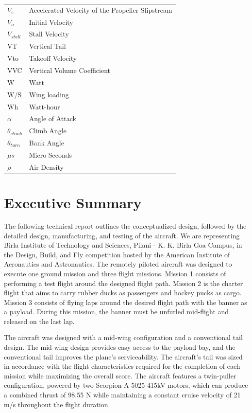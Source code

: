 \documentclass[10pt, letterpaper]{article}
\begin{document}
{\begin{minipage}{0.48\textwidth}
\begin{tabular}{ll}
$V_e$ & Accelerated Velocity of the Propeller Slipstream \\
$V_o$ & Initial Velocity \\
$V_{stall}$ & Stall Velocity \\
VT & Vertical Tail \\
Vto & Takeoff Velocity \\
VVC & Vertical Volume Coefficient \\
W & Watt \\
W/S & Wing loading \\
Wh & Watt-hour \\
$\alpha$ & Angle of Attack \\
$\theta_{climb}$ & Climb Angle \\
$\theta_{turn}$ & Bank Angle \\
$\mu s$ & Micro Seconds \\
$\rho$ & Air Density \\
\end{tabular}
\end{minipage}

}

\newpage

\section{Executive Summary}
The following technical report outlines the conceptualized design, followed by the detailed design, manufacturing, and testing of the aircraft. We are representing Birla Institute of Technology and Sciences, Pilani - K. K. Birla Goa Campus, in the Design, Build, and Fly competition hosted by the American Institute of Aeronautics and Astronautics. The remotely piloted aircraft was designed to execute one ground mission and three flight missions. Mission 1 consists of performing a test flight around the designed flight path. Mission 2 is the charter flight that aims to carry rubber ducks as passengers and hockey pucks as cargo. Mission 3 consists of flying laps around the desired flight path with the banner as a payload. During this mission, the banner must be unfurled mid-flight and released on the last lap.

The aircraft was designed with a mid-wing configuration and a conventional tail design. The mid-wing design provides easy access to the payload bay, and the conventional tail improves the plane’s serviceability. The aircraft’s tail was sized in accordance with the flight characteristics required for the completion of each mission while maximizing the overall score. The aircraft features a twin-puller configuration, powered by two Scorpion A-5025-415kV motors, which can produce a combined thrust of 98.55 N while maintaining a constant cruise velocity of 21 m/s throughout the flight duration.
\end{document}
